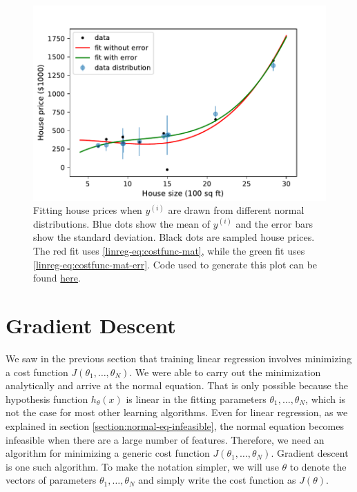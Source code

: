 \documentclass{article}
\theoremstyle{definition}
\begin{document}
\begin{figure}[ht]
\centering
\includegraphics[scale=0.7]{images/lin_reg/yerror.pdf}
\caption{Fitting house prices when $y^{(i)}$ are drawn from different normal distributions. Blue dots show the mean of $y^{(i)}$ and the error bars show the standard deviation. Black dots are sampled house prices. The red fit uses \eqref{linreg-eq:costfunc-mat}, while the green fit uses \eqref{linreg-eq:costfunc-mat-err}. Code used to generate this plot can be found \href{https://github.com/siavashaslanbeigi/ml_notes/blob/master/src/lin_reg/yerror.ipynb}{\color{blue} here}.}
\label{linreg-fig:yerror}
\end{figure}


\newpage
\section{Gradient Descent}
We saw in the previous section that training linear regression involves minimizing a cost function $J(\theta_1,\dots,\theta_N)$. We were able to carry out the minimization analytically and arrive at the normal equation. That is only possible because the hypothesis function $h_{\theta}(x)$ is linear in the fitting parameters $\theta_1,\dots,\theta_N$, which is not the case for most other learning algorithms.
Even for linear regression, as we explained in section \ref{section:normal-eq-infeasible}, the normal equation becomes infeasible when there are a large number of features. Therefore, we need an algorithm for minimizing a generic cost function $J(\theta_1,\dots,\theta_N)$. Gradient descent is one such algorithm. To make the notation simpler, we will use $\theta$ to denote the vectors of parameters $\theta_1,\dots,\theta_N$ and simply write the cost function as $J(\theta)$.
\end{document}
